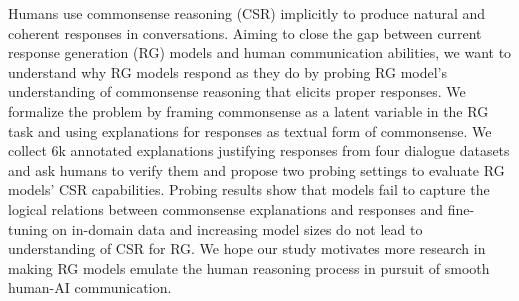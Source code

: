 Humans use commonsense reasoning (CSR) implicitly to produce natural and coherent responses in conversations. Aiming to close the gap between current response generation (RG) models and human communication abilities, we want to understand why RG models respond as they do by probing RG model's understanding of commonsense reasoning that elicits proper responses. We formalize the problem by framing commonsense as a latent variable in the RG task and using explanations for responses as textual form of commonsense. We collect 6k annotated explanations justifying responses from four dialogue datasets and ask humans to verify them and propose two probing settings to evaluate RG models' CSR capabilities. Probing results show that models fail to capture the logical relations between commonsense explanations and responses and fine-tuning on in-domain data and increasing model sizes do not lead to understanding of CSR for RG. We hope our study motivates more research in making RG models emulate the human reasoning process in pursuit of smooth human-AI communication.
